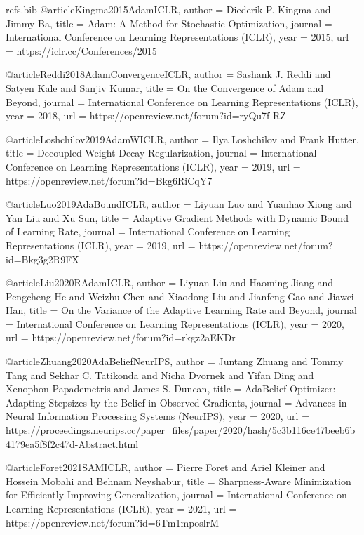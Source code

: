 \begin{filecontents*}{refs.bib}
@article{Kingma2015AdamICLR,
  author = {Diederik P. Kingma and Jimmy Ba},
  title = {Adam: A Method for Stochastic Optimization},
  journal = {International Conference on Learning Representations (ICLR)},
  year = {2015},
  url = {https://iclr.cc/Conferences/2015}
}

@article{Reddi2018AdamConvergenceICLR,
  author = {Sashank J. Reddi and Satyen Kale and Sanjiv Kumar},
  title = {On the Convergence of Adam and Beyond},
  journal = {International Conference on Learning Representations (ICLR)},
  year = {2018},
  url = {https://openreview.net/forum?id=ryQu7f-RZ}
}

@article{Loshchilov2019AdamWICLR,
  author = {Ilya Loshchilov and Frank Hutter},
  title = {Decoupled Weight Decay Regularization},
  journal = {International Conference on Learning Representations (ICLR)},
  year = {2019},
  url = {https://openreview.net/forum?id=Bkg6RiCqY7}
}

@article{Luo2019AdaBoundICLR,
  author = {Liyuan Luo and Yuanhao Xiong and Yan Liu and Xu Sun},
  title = {Adaptive Gradient Methods with Dynamic Bound of Learning Rate},
  journal = {International Conference on Learning Representations (ICLR)},
  year = {2019},
  url = {https://openreview.net/forum?id=Bkg3g2R9FX}
}

@article{Liu2020RAdamICLR,
  author = {Liyuan Liu and Haoming Jiang and Pengcheng He and Weizhu Chen and Xiaodong Liu and Jianfeng Gao and Jiawei Han},
  title = {On the Variance of the Adaptive Learning Rate and Beyond},
  journal = {International Conference on Learning Representations (ICLR)},
  year = {2020},
  url = {https://openreview.net/forum?id=rkgz2aEKDr}
}

@article{Zhuang2020AdaBeliefNeurIPS,
  author = {Juntang Zhuang and Tommy Tang and Sekhar C. Tatikonda and Nicha Dvornek and Yifan Ding and Xenophon Papademetris and James S. Duncan},
  title = {AdaBelief Optimizer: Adapting Stepsizes by the Belief in Observed Gradients},
  journal = {Advances in Neural Information Processing Systems (NeurIPS)},
  year = {2020},
  url = {https://proceedings.neurips.cc/paper_files/paper/2020/hash/5c3b116ce47beeb6b4179ea5f8f2c47d-Abstract.html}
}

@article{Foret2021SAMICLR,
  author = {Pierre Foret and Ariel Kleiner and Hossein Mobahi and Behnam Neyshabur},
  title = {Sharpness-Aware Minimization for Efficiently Improving Generalization},
  journal = {International Conference on Learning Representations (ICLR)},
  year = {2021},
  url = {https://openreview.net/forum?id=6Tm1mposlrM}
}


\end{filecontents*}
